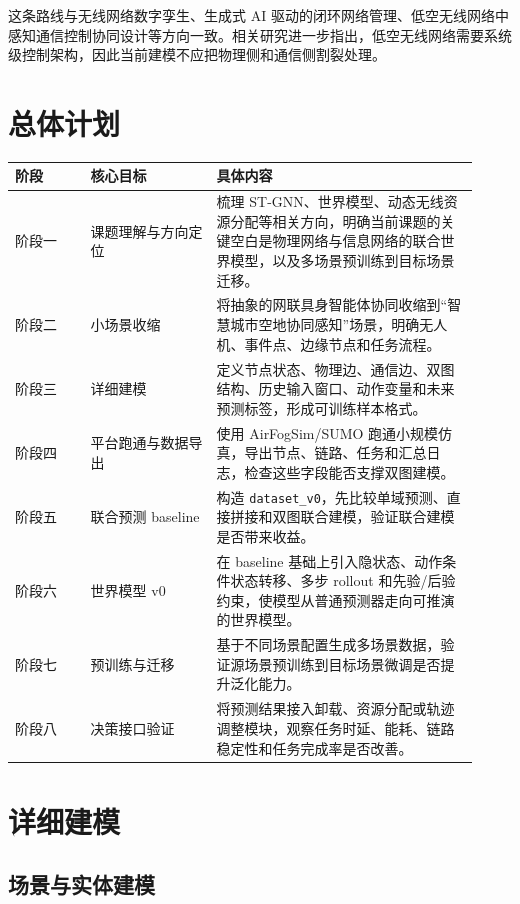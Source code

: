 ﻿\documentclass[UTF8,a4paper,11pt]{ctexart}
\newcommand{\code}[1]{\texttt{#1}}
\begin{document}
这条路线与无线网络数字孪生\cite{tao2024digitaltwin}、生成式 AI 驱动的闭环网络管理\cite{huang2025closedloop}、低空无线网络中感知通信控制协同设计\cite{jin2025codesign}等方向一致。相关研究进一步指出，低空无线网络需要系统级控制架构\cite{jin2026lawn}，因此当前建模不应把物理侧和通信侧割裂处理。

\section{总体计划}

\begin{longtable}{p{0.15\linewidth} p{0.25\linewidth} p{0.52\linewidth}}
\toprule
阶段 & 核心目标 & 具体内容 \\
\midrule
阶段一 & 课题理解与方向定位 & 梳理 ST-GNN、世界模型、动态无线资源分配等相关方向，明确当前课题的关键空白是物理网络与信息网络的联合世界模型，以及多场景预训练到目标场景迁移。\\
阶段二 & 小场景收缩 & 将抽象的网联具身智能体协同收缩到“智慧城市空地协同感知”场景，明确无人机、事件点、边缘节点和任务流程。\\
阶段三 & 详细建模 & 定义节点状态、物理边、通信边、双图结构、历史输入窗口、动作变量和未来预测标签，形成可训练样本格式。\\
阶段四 & 平台跑通与数据导出 & 使用 AirFogSim/SUMO 跑通小规模仿真，导出节点、链路、任务和汇总日志，检查这些字段能否支撑双图建模。\\
阶段五 & 联合预测 baseline & 构造 \code{dataset\_v0}，先比较单域预测、直接拼接和双图联合建模，验证联合建模是否带来收益。\\
阶段六 & 世界模型 v0 & 在 baseline 基础上引入隐状态、动作条件状态转移、多步 rollout 和先验/后验约束，使模型从普通预测器走向可推演的世界模型。\\
阶段七 & 预训练与迁移 & 基于不同场景配置生成多场景数据，验证源场景预训练到目标场景微调是否提升泛化能力。\\
阶段八 & 决策接口验证 & 将预测结果接入卸载、资源分配或轨迹调整模块，观察任务时延、能耗、链路稳定性和任务完成率是否改善。\\
\bottomrule
\end{longtable}

\section{详细建模}

\subsection{场景与实体建模}
\end{document}
